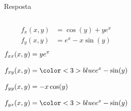 \begin{resolution}{Resposta}
\begin{columns}
  \begin{align*}
    f_x(x, y) & = \cos(y) + ye^x \\[3mm]
    f_y(x, y) & = e^x - x\sin(y)
  \end{align*}
\pause
  \begin{align*}
    f_{xx}(x, y) & = ye^x                           \\[3mm]
    f_{xy}(x, y) & = \color<3>{blue}{e^x - \sin(y)} \\[3mm]
    f_{yy}(x, y) & = -x\cos(y)                      \\[3mm]
    f_{yx}(x, y) & = \color<3>{blue}{e^x - \sin(y)}
  \end{align*}
\end{columns}
\end{resolution}

